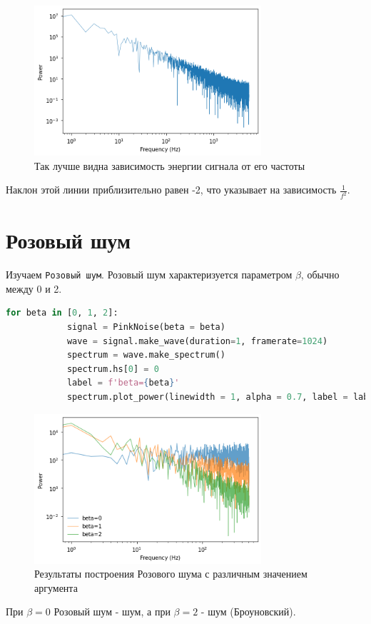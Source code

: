 \documentclass[a4paper, 12pt]{report}
\begin{document}
	\begin{figure}[H]
		\centering
		\includegraphics[width=0.75\textwidth]{br3.png}
		\caption{Так лучше видна зависимость энергии сигнала от его частоты}
		\label{fig:br3}
	\end{figure}
	Наклон этой линии приблизительно равен -2, что указывает на зависимость $\frac{1}{f^2}$.

	\chapter{Розовый шум}
	Изучаем \texttt{Розовый шум}. Розовый шум характеризуется параметром $\beta$, обычно между 0 и 2.
	\begin{lstlisting}[language=Python,caption=Построение Розового шума]
		for beta in [0, 1, 2]:
			signal = PinkNoise(beta = beta)
			wave = signal.make_wave(duration=1, framerate=1024)
			spectrum = wave.make_spectrum()
			spectrum.hs[0] = 0
			label = f'beta={beta}'
			spectrum.plot_power(linewidth = 1, alpha = 0.7, label = label)
	\end{lstlisting}
	\begin{figure}[H]
		\centering
		\includegraphics[width=0.75\textwidth]{beta1.png}
		\caption{Результаты построения Розового шума с различным значением аргумента}
		\label{fig:beta1}
	\end{figure}
	При $\beta = 0$ Розовый шум -  шум, а при $\beta = 2$ -  шум (Броуновский).
	
\end{document}
